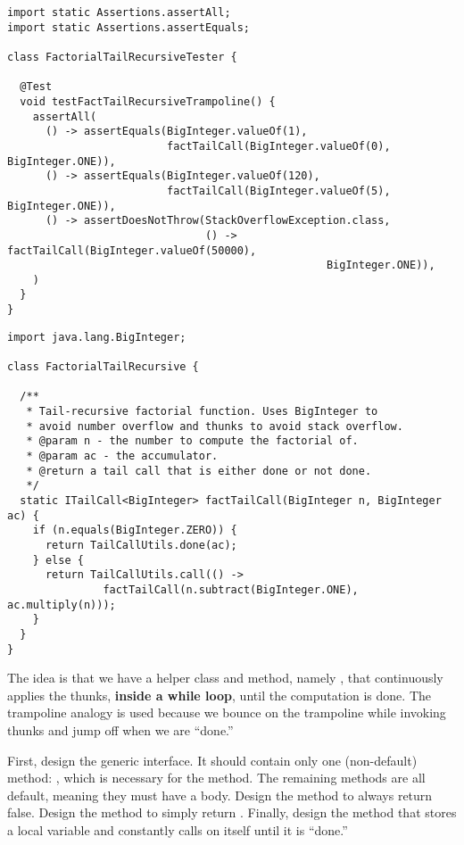 \begin{lstlisting}[language=MyJava]
import static Assertions.assertAll;
import static Assertions.assertEquals;

class FactorialTailRecursiveTester {
  
  @Test 
  void testFactTailRecursiveTrampoline() {
    assertAll(
      () -> assertEquals(BigInteger.valueOf(1), 
                         factTailCall(BigInteger.valueOf(0), BigInteger.ONE)),
      () -> assertEquals(BigInteger.valueOf(120), 
                         factTailCall(BigInteger.valueOf(5), BigInteger.ONE)),
      () -> assertDoesNotThrow(StackOverflowException.class,
                               () -> factTailCall(BigInteger.valueOf(50000), 
                                                  BigInteger.ONE)),
    )
  }
}
\end{lstlisting}

\begin{lstlisting}[language=MyJava]
import java.lang.BigInteger;

class FactorialTailRecursive {
 
  /**
   * Tail-recursive factorial function. Uses BigInteger to 
   * avoid number overflow and thunks to avoid stack overflow.
   * @param n - the number to compute the factorial of.
   * @param ac - the accumulator.
   * @return a tail call that is either done or not done.
   */
  static ITailCall<BigInteger> factTailCall(BigInteger n, BigInteger ac) {
    if (n.equals(BigInteger.ZERO)) {
      return TailCallUtils.done(ac);
    } else {
      return TailCallUtils.call(() -> 
               factTailCall(n.subtract(BigInteger.ONE), ac.multiply(n)));
    }
  }
}
\end{lstlisting}

The idea is that we have a helper class and method, namely , that continuously applies the thunks, \textbf{inside a while loop}, until the computation is done. The trampoline analogy is used because we bounce on the trampoline while invoking thunks and jump off when we are ``done.''

First, design the generic  interface. It should contain only one (non-default) method: , which is necessary for the  method. The remaining methods are all default, meaning they must have a body. Design the  method to always return false. Design the  method to simply return . Finally, design the  method that stores a local variable and constantly calls  on itself until it is ``done.'' 

